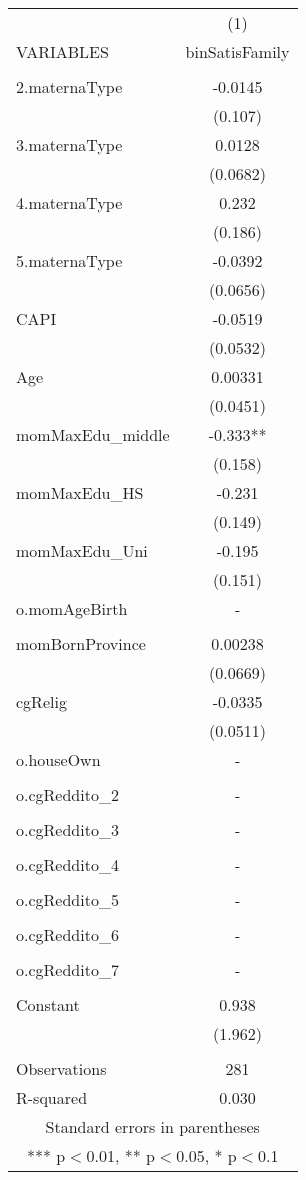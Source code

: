\begin{tabular}{lc} \hline
 & (1) \\
VARIABLES & binSatisFamily \\ \hline
 &  \\
2.maternaType & -0.0145 \\
 & (0.107) \\
3.maternaType & 0.0128 \\
 & (0.0682) \\
4.maternaType & 0.232 \\
 & (0.186) \\
5.maternaType & -0.0392 \\
 & (0.0656) \\
CAPI & -0.0519 \\
 & (0.0532) \\
Age & 0.00331 \\
 & (0.0451) \\
momMaxEdu\_middle & -0.333** \\
 & (0.158) \\
momMaxEdu\_HS & -0.231 \\
 & (0.149) \\
momMaxEdu\_Uni & -0.195 \\
 & (0.151) \\
o.momAgeBirth & - \\
 &  \\
momBornProvince & 0.00238 \\
 & (0.0669) \\
cgRelig & -0.0335 \\
 & (0.0511) \\
o.houseOwn & - \\
 &  \\
o.cgReddito\_2 & - \\
 &  \\
o.cgReddito\_3 & - \\
 &  \\
o.cgReddito\_4 & - \\
 &  \\
o.cgReddito\_5 & - \\
 &  \\
o.cgReddito\_6 & - \\
 &  \\
o.cgReddito\_7 & - \\
 &  \\
Constant & 0.938 \\
 & (1.962) \\
 &  \\
Observations & 281 \\
 R-squared & 0.030 \\ \hline
\multicolumn{2}{c}{ Standard errors in parentheses} \\
\multicolumn{2}{c}{ *** p$<$0.01, ** p$<$0.05, * p$<$0.1} \\
\end{tabular}

